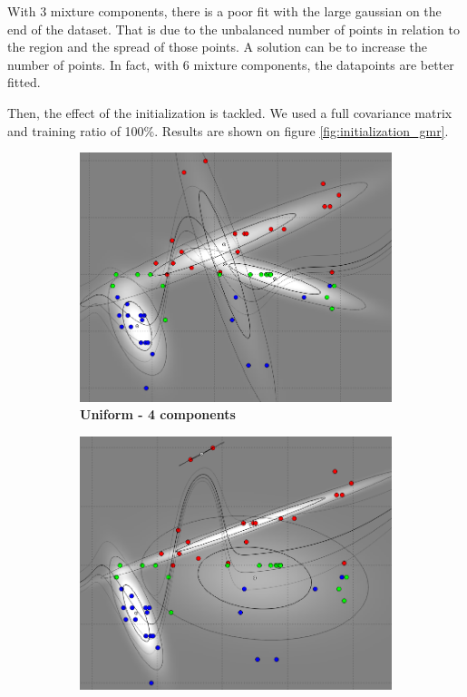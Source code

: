 With 3 mixture components, there is a poor fit with the large gaussian on the end of the dataset. That is due to the unbalanced number of points in relation to the region and the spread of those points. A solution can be to increase the number of points. In fact, with 6 mixture components, the datapoints are better fitted.

Then, the effect of the initialization is tackled. We used a full covariance matrix and training ratio of 100\%. Results are shown on figure \ref{fig:initialization_gmr}.


\begin{figure}[!ht]
\centering
\begin{subfigure}[h]{0.3\textwidth}
\centering
\includegraphics[height=0.11\textheight]{./regression/full_cov_uniform_4_mixture_100train.png}
\caption{\bf Uniform - 4 components}
\end{subfigure}
\begin{subfigure}[h]{0.3\textwidth}
\centering
\includegraphics[height=0.11\textheight]{./regression/full_cov_random_4_mixture_100train.png}

\end{subfigure}
\end{figure}
